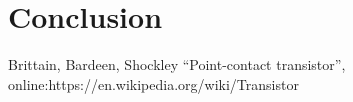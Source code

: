 \documentclass[technote,10pt,a4paper]{IEEEtran}
\begin{document}
\section{Conclusion}



\begin{thebibliography}{1}
  \providecommand{\url}[1]{#1}

  Brittain, Bardeen, Shockley ``Point-contact transistor'', online:\url{https://en.wikipedia.org/wiki/Transistor}




\end{thebibliography}
\end{document}
